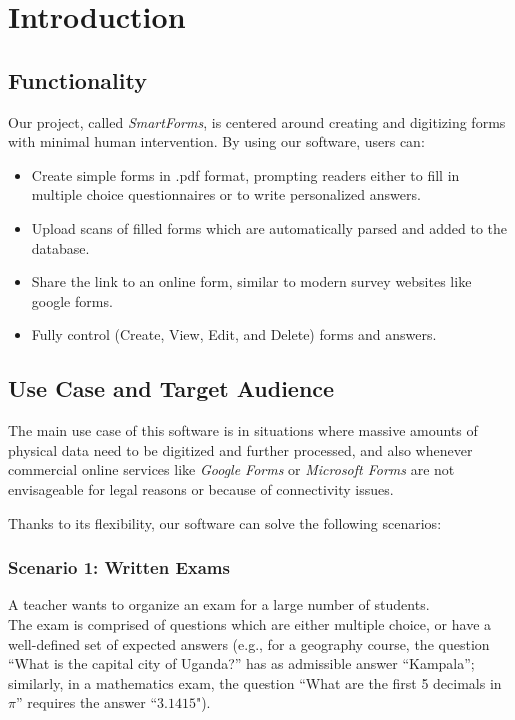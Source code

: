 \documentclass[11pt, a4paper]{report}
\begin{document}
\tableofcontents

\cleardoublepage
\pagestyle{main}
\let\ps@plain\ps@main


\chapter{Introduction}

\section{Functionality}

Our project, called \textit{SmartForms}, is centered around creating and digitizing forms with minimal human intervention. By using our software, users can:
\begin{itemize}
    \item Create simple forms in .pdf format, prompting readers either to fill in multiple choice questionnaires or to write personalized answers.
    \item Upload scans of filled forms which are automatically parsed and added to the database.
    \item Share the link to an online form, similar to modern survey websites like google forms.
    \item Fully control (Create, View, Edit, and Delete) forms and answers.
\end{itemize}

\section{Use Case and Target Audience}

The main use case of this software is in situations where massive amounts of physical data need to be digitized and further processed, and also whenever commercial online services like \textit{Google Forms} or \textit{Microsoft Forms} are not envisageable for legal reasons or because of connectivity issues.

Thanks to its flexibility, our software can solve the following scenarios:

\subsection*{Scenario 1: Written Exams}

A teacher wants to organize an exam for a large number of students.\\
The exam is comprised of questions which are either multiple choice, or have a well-defined set of expected answers (e.g., for a geography course, the question ``What is the capital city of Uganda?'' has as admissible answer ``Kampala''; similarly, in a mathematics exam, the question ``What are the first 5 decimals in $\pi$'' requires the answer ``$3.1415$").
\end{document}
